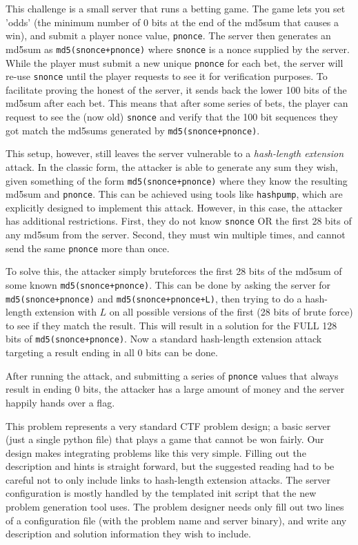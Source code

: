 This challenge is a small server that runs a betting game. The game
lets you set 'odds' (the minimum number of $0$ bits at the end of the
md5sum that causes a win), and submit a player nonce value,
\texttt{pnonce}.  The server then generates an md5sum as
\texttt{md5(snonce+pnonce)} where \texttt{snonce} is a nonce supplied
by the server. While the player must submit a new unique
\texttt{pnonce} for each bet, the server will re-use \texttt{snonce}
until the player requests to see it for verification purposes. To
facilitate proving the honest of the server, it sends back the lower
100 bits of the md5sum after each bet. This means that after some
series of bets, the player can request to see the (now old)
\texttt{snonce} and verify that the 100 bit sequences they got match
the md5sums generated by \texttt{md5(snonce+pnonce)}.

This setup, however, still leaves the server vulnerable to a
\textit{hash-length extension} attack. In the classic form, the
attacker is able to generate any sum they wish, given something of the
form \texttt{md5(snonce+pnonce)} where they know the resulting md5sum
and \texttt{pnonce}. This can be achieved using tools like
\texttt{hashpump}, which are explicitly designed to implement this
attack. However, in this case, the attacker has additional
restrictions. First, they do not know \texttt{snonce} OR the first 28
bits of any md5sum from the server. Second, they must win multiple
times, and cannot send the same \texttt{pnonce} more than once.

To solve this, the attacker simply bruteforces the first 28 bits of
the md5sum of some known \texttt{md5(snonce+pnonce)}. This can be done
by asking the server for \texttt{md5(snonce+pnonce)} and
\texttt{md5(snonce+pnonce+L)}, then trying to do a hash-length
extension with $L$ on all possible versions of the first (28 bits of
brute force) to see if they match the result. This will result in a
solution for the FULL 128 bits of \texttt{md5(snonce+pnonce)}. Now a
standard hash-length extension attack targeting a result ending in all
0 bits can be done.\cite{parlor:mslc}

After running the attack, and submitting a series of \texttt{pnonce}
values that always result in ending 0 bits, the attacker has a large
amount of money and the server happily hands over a flag.

This problem represents a very standard CTF problem design; a basic
server (just a single python file) that plays a game that cannot be
won fairly. Our design makes integrating problems like this very
simple. Filling out the description and hints is straight forward,
but the suggested reading had to be careful not to only include
links to hash-length extension attacks. The server configuration is
mostly handled by the templated init script that the new problem
generation tool uses. The problem designer needs only fill out two
lines of a configuration file (with the problem name and server
binary), and write any description and solution information they wish
to include.

